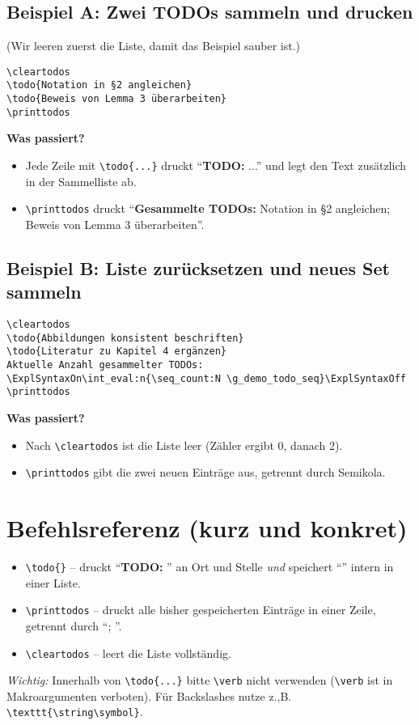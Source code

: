 \documentclass[11pt,a4paper]{book}
\newcommand{\todo}[1]{\textbf{TODO:}~#1\ExplSyntaxOn\demo_todo_add:n{#1}\ExplSyntaxOff}
\newcommand{\printtodos}{\par\medskip\textbf{Gesammelte TODOs: }\ExplSyntaxOn\seq_use:Nn \g_demo_todo_seq {; }\ExplSyntaxOff\par}
\newcommand{\cleartodos}{\ExplSyntaxOn\seq_gclear:N \g_demo_todo_seq\ExplSyntaxOff}
\begin{document}
\subsection*{Beispiel A: Zwei TODOs sammeln und drucken}
\noindent (Wir leeren zuerst die Liste, damit das Beispiel sauber ist.)

\begin{verbatim}
\cleartodos
\todo{Notation in §2 angleichen}
\todo{Beweis von Lemma 3 überarbeiten}
\printtodos
\end{verbatim}

\medskip
\noindent \textbf{Was passiert?}
\begin{itemize}
\item Jede Zeile mit \verb|\todo{...}| druckt \enquote{\textbf{TODO:} ...} und legt den Text zusätzlich in der Sammelliste ab.
\item \verb|\printtodos| druckt \enquote{\textbf{Gesammelte TODOs:} Notation in §2 angleichen; Beweis von Lemma 3 überarbeiten}.
\end{itemize}

\subsection*{Beispiel B: Liste zurücksetzen und neues Set sammeln}
\begin{verbatim}
\cleartodos
\todo{Abbildungen konsistent beschriften}
\todo{Literatur zu Kapitel 4 ergänzen}
Aktuelle Anzahl gesammelter TODOs:
\ExplSyntaxOn\int_eval:n{\seq_count:N \g_demo_todo_seq}\ExplSyntaxOff
\printtodos
\end{verbatim}

\medskip
\noindent \textbf{Was passiert?}
\begin{itemize}
\item Nach \verb|\cleartodos| ist die Liste leer (Zähler ergibt 0, danach 2).
\item \verb|\printtodos| gibt die zwei neuen Einträge aus, getrennt durch Semikola.
\end{itemize}

\section{Befehlsreferenz (kurz und konkret)}
\begin{itemize}
\item \verb|\todo{}| – druckt \enquote{\textbf{TODO:} } an Ort und Stelle \emph{und} speichert \enquote{} intern in einer Liste.
\item \verb|\printtodos| – druckt alle bisher gespeicherten Einträge in einer Zeile, getrennt durch \enquote{; }.
\item \verb|\cleartodos| – leert die Liste vollständig.
\end{itemize}
\textit{Wichtig:} Innerhalb von \verb|\todo{...}| bitte \verb|\verb| nicht verwenden (\verb|\verb| ist in Makroargumenten verboten). Für Backslashes nutze z.,B. \verb|\texttt{\string\symbol}|.
\end{document}
